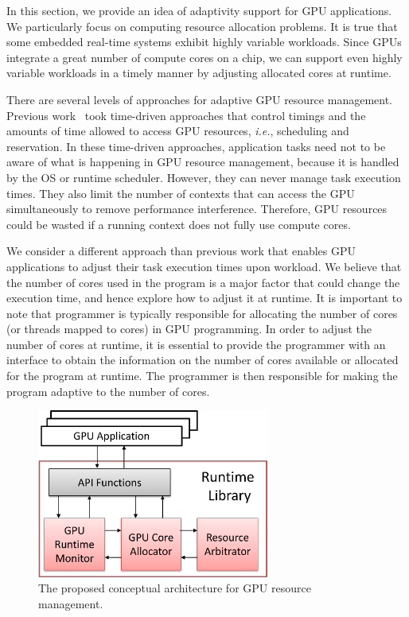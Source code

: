 \documentclass[times, 10pt, twocolumn]{article}
\begin{document}
In this section, we provide an idea of adaptivity support for GPU
applications.
We particularly focus on computing resource allocation problems.
It is true that some embedded real-time systems exhibit highly variable
workloads.
Since GPUs integrate a great number of compute cores on a chip, we can
support even highly variable workloads in a timely manner by adjusting
allocated cores at runtime.

There are several levels of approaches for adaptive GPU resource
management.
Previous work~\cite{Kato_RTAS11, Kato_RTSS11, Kato_ATC11} took
time-driven approaches that control timings and the amounts of time
allowed to access GPU resources, \textit{i.e.}, scheduling and
reservation.
In these time-driven approaches, application tasks need not to be aware
of what is happening in GPU resource management, because it is handled
by the OS or runtime scheduler.
However, they can never manage task execution times.
They also limit the number of contexts that can access the GPU
simultaneously to remove performance interference.
Therefore, GPU resources could be wasted if a running context does not
fully use compute cores.

We consider a different approach than previous work that enables GPU
applications to adjust their task execution times upon workload.
We believe that the number of cores used in the program is a major
factor that could change the execution time, and hence explore how to
adjust it at runtime.
It is important to note that programmer is typically responsible for
allocating the number of cores (or threads mapped to cores) in GPU
programming.
In order to adjust the number of cores at runtime, it is essential to
provide the programmer with an interface to obtain the information on
the number of cores available or allocated for the program at runtime.
The programmer is then responsible for making the program adaptive to
the number of cores.

\begin{figure}[t]
\includegraphics[width=3.0in]{architecture.eps}
\caption{The proposed conceptual architecture for GPU resource management.} 
\label{fig_arch}
\end{figure}
\end{document}
